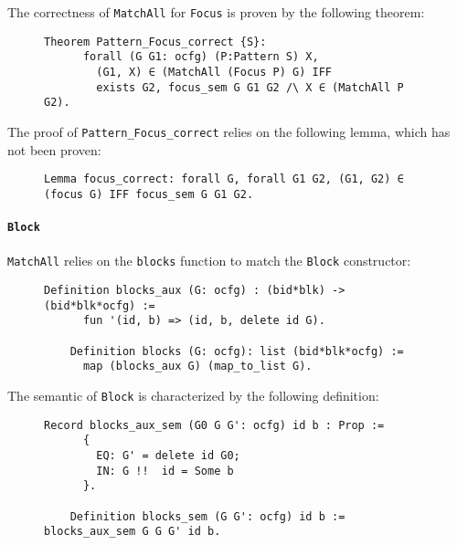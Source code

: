 \documentclass[11pt]{article}
\newcommand{\inlinecoq}[1]{\mbox{\lstinline[style=customcoq,columns=fixed,basewidth=.48em]{#1}}}
\newcommand{\ilc}[1]{\inlinecoq{#1}}
\begin{document}
The correctness of \ilc{MatchAll} for \ilc{Focus} is proven by the following theorem:

\begin{figure}[H]
  \label{fig:sem_focus}
  \begin{lstlisting}[style=customcoq,basicstyle=\small\ttfamily]
    Theorem Pattern_Focus_correct {S}:
      forall (G G1: ocfg) (P:Pattern S) X, 
        (G1, X) ∈ (MatchAll (Focus P) G) IFF
        exists G2, focus_sem G G1 G2 /\ X ∈ (MatchAll P G2).
  \end{lstlisting}
\end{figure}

The proof of \ilc{Pattern_Focus_correct} relies on the following lemma, which has not been proven:

\begin{figure}[H]
  \label{fig:focus_cor}
  \begin{lstlisting}[style=customcoq,basicstyle=\small\ttfamily]
    Lemma focus_correct: forall G, forall G1 G2, (G1, G2) ∈ (focus G) IFF focus_sem G G1 G2.
  \end{lstlisting}
\end{figure}

\paragraph{\ilc{Block}}

\ilc{MatchAll} relies on the \ilc{blocks} function to match the \ilc{Block} constructor:

\begin{figure}[H]
  \label{fig:blocks_fun}
  \begin{lstlisting}[style=customcoq,basicstyle=\small\ttfamily]
    Definition blocks_aux (G: ocfg) : (bid*blk) -> (bid*blk*ocfg) :=
      fun '(id, b) => (id, b, delete id G).

    Definition blocks (G: ocfg): list (bid*blk*ocfg) :=
      map (blocks_aux G) (map_to_list G).
  \end{lstlisting}
\end{figure}

The semantic of \ilc{Block} is characterized by the following definition:

\begin{figure}[H]
  \label{fig:sem_block_def}
  \begin{lstlisting}[style=customcoq,basicstyle=\small\ttfamily]
    Record blocks_aux_sem (G0 G G': ocfg) id b : Prop := 
      {
        EQ: G' = delete id G0;
        IN: G !!  id = Some b
      }.

    Definition blocks_sem (G G': ocfg) id b := blocks_aux_sem G G G' id b.
  \end{lstlisting}
\end{figure}
\end{document}
